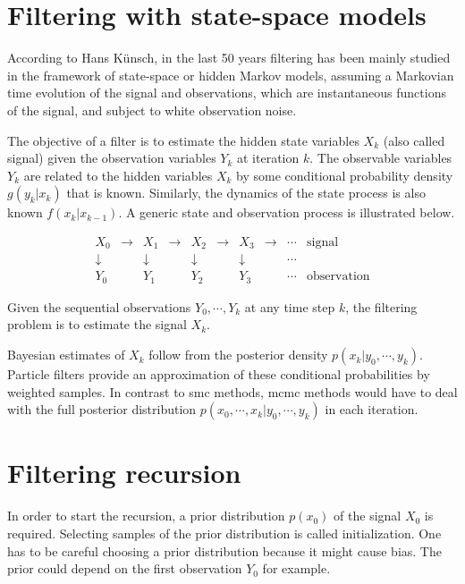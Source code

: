 \section{Filtering with state-space models}

According to Hans Künsch\cite{Kuensch2013}, in the last 50 years filtering has been mainly studied in the framework of state-space or hidden Markov models, assuming a Markovian time evolution of the signal and observations, which are instantaneous functions of the signal, and subject to white observation noise.

The objective of a filter is to estimate the hidden state variables $X_k$ (also called signal) given the observation variables $Y_k$ at iteration $k$. The observable variables $Y_k$ are related to the hidden variables $X_k$ by some conditional probability density $g(y_k|x_k)$ that is known. Similarly, the dynamics of the state process is also known $f(x_k|x_{k-1})$. A generic state and observation process is illustrated below.\cite{Kuensch2013}

\[\begin{array}{cccccccccc}
X_0 & \to & X_1 & \to & X_2 & \to & X_3 & \to & \cdots & \text{signal} \\
\downarrow & & \downarrow & & \downarrow & & \downarrow & & \cdots & \\
Y_0 & & Y_1 & & Y_2 & & Y_3 & & \cdots & \text{observation}
\end{array}\]

Given the sequential observations $Y_0,\cdots,Y_k$ at any time step $k$, the filtering problem is to estimate the signal $X_k$.

Bayesian estimates of $X_k$ follow from the posterior density $p(x_k|y_0,\cdots,y_k)$. Particle filters provide an approximation of these conditional probabilities by weighted samples. In contrast to \gls{smc} methods, \gls{mcmc} methods would have to deal with the full posterior distribution $p(x_0,\cdots,x_k|y_0,\cdots,y_k)$ in each iteration.

\section{Filtering recursion}

In order to start the recursion, a prior distribution $p(x_0)$ of the signal $X_0$ is required. Selecting samples of the prior distribution is called initialization. One has to be careful choosing a prior distribution because it might cause bias. The prior could depend on the first observation $Y_0$ for example.

